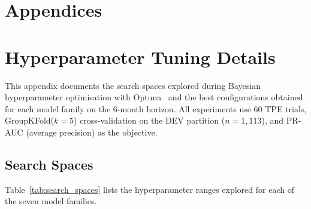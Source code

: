 
\appendix
{}
\chapter*{Appendices}

\chapter{Hyperparameter Tuning Details}
\label{app:tuning}

This appendix documents the search spaces explored during Bayesian hyperparameter optimisation with Optuna~\cite{optuna2019} and the best configurations obtained for each model family on the 6-month horizon.
All experiments use 60 TPE trials, GroupKFold($k{=}5$) cross-validation on the DEV partition ($n{=}1{,}113$), and PR-AUC (average precision) as the objective.

\section{Search Spaces}
\label{app:search_spaces}

Table~\ref{tab:search_spaces} lists the hyperparameter ranges explored for each of the seven model families.

